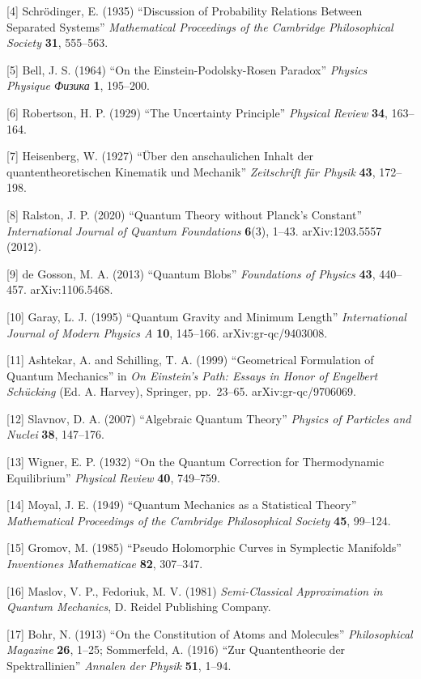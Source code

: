 \documentclass[
]{article}
\begin{document}
{[}4{]} Schrödinger, E. (1935) ``Discussion of Probability Relations
Between Separated Systems'' \emph{Mathematical Proceedings of the
Cambridge Philosophical Society} \textbf{31}, 555--563.

{[}5{]} Bell, J. S. (1964) ``On the Einstein-Podolsky-Rosen Paradox''
\emph{Physics Physique Физика} \textbf{1}, 195--200.

{[}6{]} Robertson, H. P. (1929) ``The Uncertainty Principle''
\emph{Physical Review} \textbf{34}, 163--164.

{[}7{]} Heisenberg, W. (1927) ``Über den anschaulichen Inhalt der
quantentheoretischen Kinematik und Mechanik'' \emph{Zeitschrift für
Physik} \textbf{43}, 172--198.

{[}8{]} Ralston, J. P. (2020) ``Quantum Theory without Planck's
Constant'' \emph{International Journal of Quantum Foundations}
\textbf{6}(3), 1--43. arXiv:1203.5557 (2012).

{[}9{]} de Gosson, M. A. (2013) ``Quantum Blobs'' \emph{Foundations of
Physics} \textbf{43}, 440--457. arXiv:1106.5468.

{[}10{]} Garay, L. J. (1995) ``Quantum Gravity and Minimum Length''
\emph{International Journal of Modern Physics A} \textbf{10}, 145--166.
arXiv:gr-qc/9403008.

{[}11{]} Ashtekar, A. and Schilling, T. A. (1999) ``Geometrical
Formulation of Quantum Mechanics'' in \emph{On Einstein's Path: Essays
in Honor of Engelbert Schücking} (Ed. A. Harvey), Springer, pp.~23--65.
arXiv:gr-qc/9706069.

{[}12{]} Slavnov, D. A. (2007) ``Algebraic Quantum Theory''
\emph{Physics of Particles and Nuclei} \textbf{38}, 147--176.

{[}13{]} Wigner, E. P. (1932) ``On the Quantum Correction for
Thermodynamic Equilibrium'' \emph{Physical Review} \textbf{40},
749--759.

{[}14{]} Moyal, J. E. (1949) ``Quantum Mechanics as a Statistical
Theory'' \emph{Mathematical Proceedings of the Cambridge Philosophical
Society} \textbf{45}, 99--124.

{[}15{]} Gromov, M. (1985) ``Pseudo Holomorphic Curves in Symplectic
Manifolds'' \emph{Inventiones Mathematicae} \textbf{82}, 307--347.

{[}16{]} Maslov, V. P., Fedoriuk, M. V. (1981) \emph{Semi-Classical
Approximation in Quantum Mechanics}, D. Reidel Publishing Company.

{[}17{]} Bohr, N. (1913) ``On the Constitution of Atoms and Molecules''
\emph{Philosophical Magazine} \textbf{26}, 1--25; Sommerfeld, A. (1916)
``Zur Quantentheorie der Spektrallinien'' \emph{Annalen der Physik}
\textbf{51}, 1--94.
\end{document}
